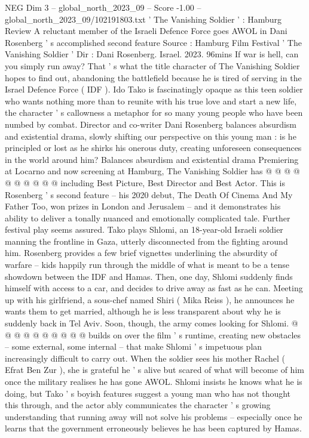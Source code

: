 \begin{textsample}{NEG Dim 3 – global\_north\_2023\_09 – Score -1.00 – global\_north\_2023\_09/102191803.txt}  \label{ex:f3_neg_389}
' The Vanishing Soldier ' : Hamburg Review A reluctant member of the Israeli Defence Force goes AWOL in Dani Rosenberg ' s accomplished second feature Source : Hamburg Film Festival ' The Vanishing Soldier ' Dir : Dani Rosenberg.
Israel. 2023. 96mins If war is hell, can you simply run away?
That ' s what the title character of The Vanishing Soldier hopes to find out, abandoning the battlefield because he is tired of serving in the Israel Defence Force ( IDF ).
Ido Tako is fascinatingly opaque as this teen soldier who wants nothing more than to reunite with his true love and start a new life, the character ' s callowness a metaphor for so many young people who have been numbed by combat.
Director and co-writer Dani Rosenberg balances absurdism and existential drama, slowly shifting our perspective on this young man : is he principled or lost as he shirks his onerous duty, creating unforeseen consequences in the world around him?
Balances absurdism and existential drama Premiering at Locarno and now screening at Hamburg, The Vanishing Soldier has @ @ @ @ @ @ @ @ @ @ including Best Picture, Best Director and Best Actor.
This is Rosenberg ' s second feature -- his 2020 debut, The Death Of Cinema And My Father Too, won prizes in London and Jerusalem -- and it demonstrates his ability to deliver a tonally nuanced and emotionally complicated tale.
Further festival play seems assured.
Tako plays Shlomi, an 18-year-old Israeli soldier manning the frontline in Gaza, utterly disconnected from the fighting around him.
Rosenberg provides a few brief vignettes underlining the absurdity of warfare -- kids happily run through the middle of what is meant to be a tense showdown between the IDF and Hamas.
Then, one day, Shlomi suddenly finds himself with access to a car, and decides to drive away as fast as he can.
Meeting up with his girlfriend, a sous-chef named Shiri ( Mika Reiss ), he announces he wants them to get married, although he is less transparent about why he is suddenly back in Tel Aviv.
Soon, though, the army comes looking for Shlomi. @ @ @ @ @ @ @ @ @ @ builds on over the film ' s runtime, creating new obstacles -- some external, some internal -- that make Shlomi ' s impetuous plan increasingly difficult to carry out.
When the soldier sees his mother Rachel ( Efrat Ben Zur ), she is grateful he ' s alive but scared of what will become of him once the military realises he has gone AWOL.
Shlomi insists he knows what he is doing, but Tako ' s boyish features suggest a young man who has not thought this through, and the actor ably communicates the character ' s growing understanding that running away will not solve his problems -- especially once he learns that the government erroneously believes he has been captured by Hamas.

\end{textsample}
